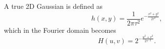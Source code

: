 \documentclass{article}
\begin{document}
A true 2D Gaussian is defined as
\begin{equation}
  h(x, y) = \frac{1}{2\pi\tau^2}e^{-\frac{x^2+y^2}{2\tau^2}},
\end{equation}
which in the Fourier domain becomes
\begin{equation}
  H(u, v) = 2^{-\frac{u^2+v^2}{2\tau^{-2}}}.
\end{equation}





\end{document}
